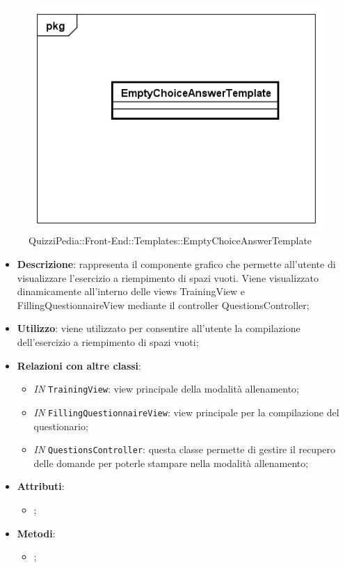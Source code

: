 		\begin{figure}[ht]
			\centering
			\includegraphics[scale=0.5,keepaspectratio]{UML/Classi/Front-End/QuizziPedia_Front-end_Templates_EmptySpaceAnswerTemplate.png}
			\caption{QuizziPedia::Front-End::Templates::EmptyChoiceAnswerTemplate}
		\end{figure} \FloatBarrier
		
		\begin{itemize}
			\item \textbf{Descrizione}: rappresenta il componente grafico che permette all'utente di visualizzare l'esercizio a riempimento di spazi vuoti. Viene visualizzato dinamicamente all'interno delle views TrainingView e FillingQuestionnaireView mediante il controller QuestionsController;
			\item \textbf{Utilizzo}: viene utilizzato per consentire all'utente la compilazione dell'esercizio a riempimento di spazi vuoti;
			\item \textbf{Relazioni con altre classi}: 
			\begin{itemize}
				\item \textit{IN} \texttt{TrainingView}: view principale della modalità allenamento; 
				\item \textit{IN} \texttt{FillingQuestionnaireView}: view principale per la compilazione del questionario;
				\item \textit{IN} \texttt{QuestionsController}: questa classe permette di gestire il recupero delle domande per poterle stampare nella modalità allenamento;
			\end{itemize}
			\item \textbf{Attributi}: 
			\begin{itemize}
				\item ;
			\end{itemize}
			\item \textbf{Metodi}: 
			\begin{itemize}
				\item ;
			\end{itemize}
		\end{itemize}
		
